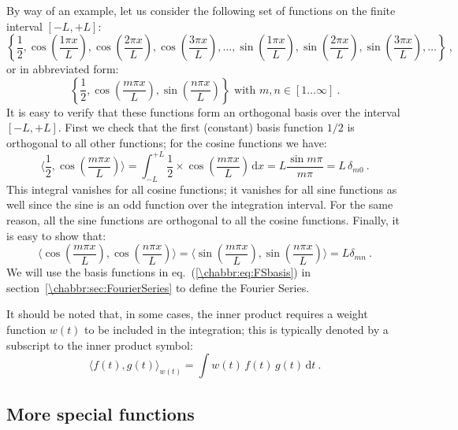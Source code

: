 By way of an example, let us consider the following set of functions on the finite interval $[-L,+L]$:
\[
	\left\{ \frac{1}{2}, \cos\left(\frac{1\pi x}{L}\right), \cos\left(\frac{2\pi x}{L}\right), \cos\left(\frac{3\pi x}{L}\right),\ldots, \sin\left(\frac{1\pi x}{L}\right), \sin\left(\frac{2\pi x}{L}\right), \sin\left(\frac{3\pi x}{L}\right),\ldots \right\}\ ,
\]
or in abbreviated form:
\begin{equation}
	\left\{ \frac{1}{2}, \cos\left(\frac{m\pi x}{L}\right), \sin\left(\frac{n\pi x}{L}\right) \right\}\text{ with }m,n\in[1\ldots\infty]\ .\label{\chabbr:eq:FSbasis}
\end{equation}
It is easy to verify that these functions form an orthogonal basis over the interval $[-L,+L]$.  First we check that the first (constant) basis function $1/2$ is orthogonal to all other functions; for the cosine functions we have:
\[
	\langle \frac{1}{2}, \cos\left(\frac{m\pi x}{L}\right) \rangle = \int_{-L}^{+L} \frac{1}{2}\times \cos\left(\frac{m\pi x}{L}\right)\,\mathrm{d}x = L\frac{\sin m\pi}{m\pi}=L\,\delta_{m0}\ .
\]
This integral vanishes for all cosine functions; it vanishes for all sine functions as well since the sine is an odd function over the integration interval.  For the same reason, all the sine functions are orthogonal to all the cosine functions.  Finally, it is easy to show that:
\[
	\langle \cos\left(\frac{m\pi x}{L}\right),\cos\left(\frac{n\pi x}{L}\right) \rangle = \langle \sin\left(\frac{m\pi x}{L}\right),\sin\left(\frac{n\pi x}{L}\right) \rangle =L\delta_{mn}\ .
\]
We will use the basis functions in eq.~(\ref{\chabbr:eq:FSbasis}) in section~\ref{\chabbr:sec:FourierSeries} to define the Fourier Series.  

It should be noted that, in some cases, the inner product requires a weight function $w(t)$ to be included in the integration; this is typically denoted by a subscript to the inner product symbol:
\begin{equation}
	\langle f(t),g(t)\rangle_{w(t)} = \int w(t)\,f(t)\,g(t)\,\mathrm{d}t\ .
\end{equation}


\subsection{More special functions}


